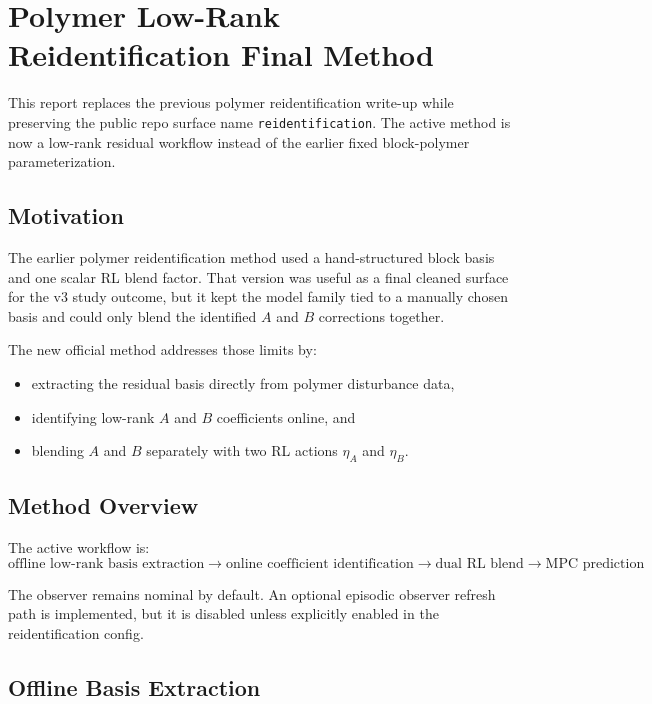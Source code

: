 \section{Polymer Low-Rank Reidentification Final Method}

This report replaces the previous polymer reidentification write-up while preserving the public repo surface name \texttt{reidentification}. The active method is now a low-rank residual workflow instead of the earlier fixed block-polymer parameterization.

\subsection{Motivation}

The earlier polymer reidentification method used a hand-structured block basis and one scalar RL blend factor. That version was useful as a final cleaned surface for the v3 study outcome, but it kept the model family tied to a manually chosen basis and could only blend the identified $A$ and $B$ corrections together.

The new official method addresses those limits by:
\begin{itemize}
    \item extracting the residual basis directly from polymer disturbance data,
    \item identifying low-rank $A$ and $B$ coefficients online, and
    \item blending $A$ and $B$ separately with two RL actions $\eta_A$ and $\eta_B$.
\end{itemize}

\subsection{Method Overview}

The active workflow is:
\[
\text{offline low-rank basis extraction} \rightarrow
\text{online coefficient identification} \rightarrow
\text{dual RL blend} \rightarrow
\text{MPC prediction}
\]

The observer remains nominal by default. An optional episodic observer refresh path is implemented, but it is disabled unless explicitly enabled in the reidentification config.

\subsection{Offline Basis Extraction}


